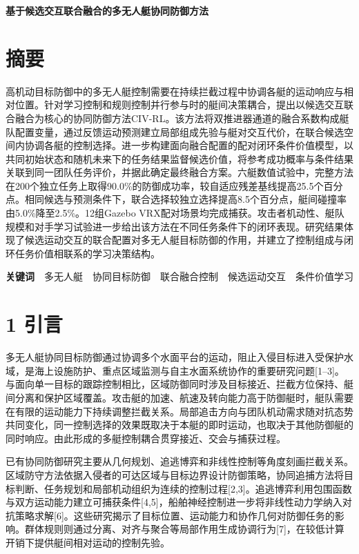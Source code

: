 \documentclass[UTF8,10.5pt,a4paper,fontset=none]{ctexart}
\begin{document}
\begin{center}
{\LARGE\bfseries\sffamily 基于候选交互联合融合的多无人艇协同防御方法}
\end{center}
\vspace{2mm}
\section{摘要}\label{ux6458ux8981}

高机动目标防御中的多无人艇控制需要在持续拦截过程中协调各艇的运动响应与相对位置。针对学习控制和规则控制并行参与时的艇间决策耦合，提出以候选交互联合融合为核心的协同防御方法CIV-RL。该方法将双推进器通道的融合系数构成艇队配置变量，通过反馈运动预测建立局部组成先验与艇对交互代价，在联合候选空间内协调各艇的控制选择。进一步构建面向融合配置的配对闭环条件价值模型，以共同初始状态和随机未来下的任务结果监督候选价值，将参考成功概率与条件结果关联到同一团队任务评价，并据此确定最终融合方案。六艇数值试验中，完整方法在200个独立任务上取得90.0\%的防御成功率，较自适应残差基线提高25.5个百分点。相同候选与预测条件下，联合选择较独立选择提高8.5个百分点，艇间碰撞率由5.0\%降至2.5\%。12组Gazebo
VRX配对场景均完成捕获。攻击者机动性、艇队规模和对手学习试验进一步给出该方法在不同任务条件下的闭环表现。研究结果体现了候选运动交互的联合配置对多无人艇目标防御的作用，并建立了控制组成与闭环任务价值相联系的学习决策结构。

\textbf{关键词}　多无人艇　协同目标防御　联合融合控制　候选运动交互　条件价值学习

\section{1 引言}\label{ux5f15ux8a00}

多无人艇协同目标防御通过协调多个水面平台的运动，阻止入侵目标进入受保护水域，是海上设施防护、重点区域监测与自主水面系统协作的重要研究问题{[}1--3{]}。与面向单一目标的跟踪控制相比，区域防御同时涉及目标接近、拦截方位保持、艇间分离和保护区域覆盖。攻击艇的加速、航速及转向能力高于防御艇时，艇队需要在有限的运动能力下持续调整拦截关系。局部追击方向与团队机动需求随对抗态势共同变化，同一控制选择的效果既取决于本艇的即时运动，也取决于其他防御艇的同时响应。由此形成的多艇控制耦合贯穿接近、交会与捕获过程。

已有协同防御研究主要从几何规划、追逃博弈和非线性控制等角度刻画拦截关系。区域防守方法依据入侵者的可达区域与目标边界设计防御策略，协同追捕方法将目标判断、任务规划和局部机动组织为连续的控制过程{[}2,3{]}。追逃博弈利用包围函数与双方运动能力建立可捕获条件{[}4,5{]}，船舶神经控制进一步将非线性动力学纳入对抗策略求解{[}6{]}。这些研究揭示了目标位置、运动能力和协作几何对防御任务的影响。群体规则则通过分离、对齐与聚合等局部作用生成协调行为{[}7{]}，在较低计算开销下提供艇间相对运动的控制先验。
\end{document}
